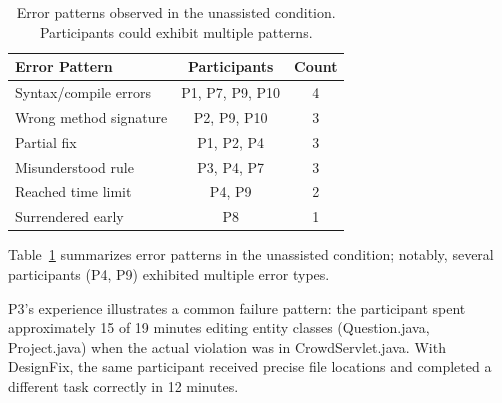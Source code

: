 \documentclass[conference]{IEEEtran}
\newcommand{\pquote}[3]{%
\vspace{2pt}
\begin{quote}\small
\textbf{#1} (\emph{#2}): \emph{``#3''}
\end{quote}
\vspace{2pt}
}
\begin{document}
\begin{table}[htbp]
\centering
\caption{Error patterns observed in the unassisted condition. Participants could exhibit multiple patterns.}
\label{tab:error-patterns}
\begin{tabular}{lcc}
\toprule
\textbf{Error Pattern} & \textbf{Participants} & \textbf{Count} \\
\midrule
Syntax/compile errors & P1, P7, P9, P10 & 4 \\
Wrong method signature & P2, P9, P10 & 3 \\
Partial fix & P1, P2, P4 & 3 \\
Misunderstood rule & P3, P4, P7 & 3 \\
\midrule
Reached time limit & P4, P9 & 2 \\
Surrendered early & P8 & 1 \\
\bottomrule
\end{tabular}
\end{table}
Table~\ref{tab:error-patterns} summarizes error patterns in the unassisted condition; notably, several participants (P4, P9) exhibited multiple error types.

P3's experience illustrates a common failure pattern: the participant spent approximately 15 of 19 minutes editing entity classes (Question.java, Project.java) when the actual violation was in CrowdServlet.java. %
With DesignFix, the same participant received precise file locations and completed a different task correctly in 12 minutes.
\end{document}
